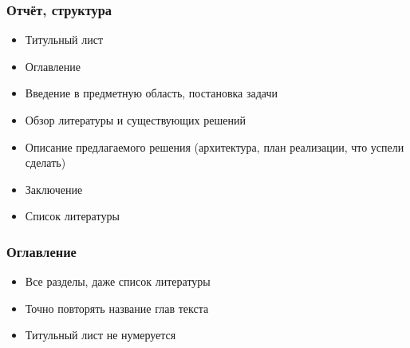 \documentclass[xetex,mathserif,serif]{beamer}
\begin{document}
    \begin{frame}
        \frametitle{Отчёт, структура}
        \begin{itemize}
            \item Титульный лист
            \item Оглавление
            \item Введение в предметную область, постановка задачи
            \item Обзор литературы и существующих решений
            \item Описание предлагаемого решения (архитектура, план реализации, что успели сделать)
            \item Заключение
            \item Список литературы
        \end{itemize}
    \end{frame}

    \begin{frame}
        \frametitle{Оглавление}
        \begin{itemize}
            \item Все разделы, даже список литературы
            \item Точно повторять название глав текста
            \item Титульный лист не нумеруется
        \end{itemize}
    \end{frame}
\end{document}
